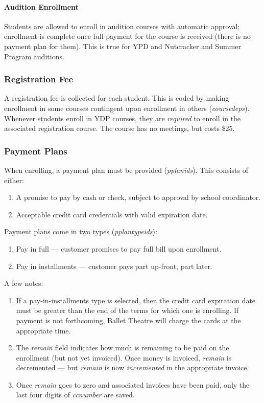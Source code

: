 \documentclass[11pt]{article}
\begin{document}
\paragraph{Audition Enrollment}

Students are allowed to enroll in audition courses with automatic
approval; enrollment is complete once full payment for the course is
received (there is no payment plan for them).  This is true for YPD
and Nutcracker and Summer Program auditions.

\subsubsection{Registration Fee}

A registration fee is collected for each student.  This is coded by making enrollment in some courses contingent upon enrollment in others (\emph{coursedeps}).  Whenever students enroll in YDP courses, they are \emph{required} to enroll in the associated registration course.  The course has no meetings, but costs \$25.

\subsubsection{Payment Plans}

When enrolling, a payment plan must be provided (\emph{pplanids}).  This consists of either:
 \begin{enumerate}
 \item A promise to pay by cash or check, subject to approval by school coordinator.
 \item Acceptable credit card credentials with valid expiration date.
 \end{enumerate}

Payment plans come in two types (\emph{pplantypeids}):
 \begin{enumerate}
 \item Pay in full --- customer promises to pay full bill upon enrollment.
 \item Pay in installments --- customer pays part up-front, part later.
 \end{enumerate}

A few notes:
 \begin{enumerate}
 \item If a pay-in-installments type is selected, then the credit card expiration date must be greater than the end of the terms for which one is enrolling.  If payment is not forthcoming, Ballet Theatre will charge the cards at the appropriate time.
 \item The \emph{remain} field indicates how much is remaining to be paid on the enrollment (but not yet invoiced).  Once money is invoiced, \emph{remain} is decremented --- but \emph{remain} is now \emph{incremented} in the appropriate invoice.
 \item Once \emph{remain} goes to zero and associated invoices have been paid, only the last four digits of \emph{ccnumber} are saved.
 \end{enumerate}
\end{document}
